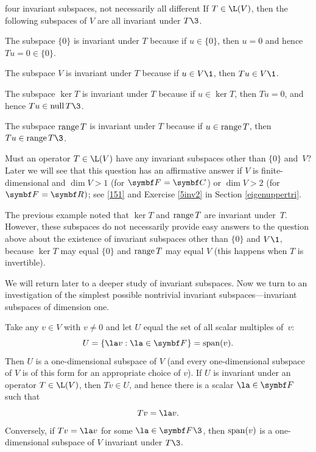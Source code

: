 \begin{example}[invariant]{four invariant subspaces, not necessarily all different}
If $T \in \L(V)$, then the following subspaces of $V$ are all invariant under $T\3$.
\begin{Subtheorem} \leftskip=-8bp
\item[\hfill$\br{0}$\hfill]
The subspace $\{0\}$ is invariant under $T$ because if $u \in \{0\}$, then $u = 0$ and hence $Tu = 0 \in \{0\}$.
\item[\hfill$V$\hfill]
The subspace $V$ is invariant under $T$ because if $u \in V\1$, then $Tu \in V\1$.
\item[\hfill$\ker T$\hfill]
The subspace $\ker T$ is invariant under $T$ because if $u \in \ker T$, then $Tu = 0$, and hence $Tu \in \ker T\3$.
\item[\hfill$\ran T$\hfill]
The subspace $\ran T$ is invariant under $T$ because if $u \in \operatorname{range} T$, then $Tu \in \ran T\3$.
\end{Subtheorem}
\vspace{-.11in}
\end{example}

\pagebreak[2]

Must an operator $T \in \L(V)$ have any invariant subspaces other than $\{0\}$ and~$V$? Later we will see that this question has an affirmative answer if $V$ is finite-dimensional and $\dim V > 1$ (for $\F{} = \C{}$) or $\dim V > 2$ (for $\F{} = \R{})$; see \ref{151} and Exercise \ref{5inv2} in Section \ref{eigenuppertri}.

The previous example noted that $\ker T$ and $\ran T$ are invariant under~$T$. However, these subspaces do not necessarily provide easy answers to the question above about the existence of invariant subspaces other than $\{0\}$ and $V\1$, because $\ker T$ may equal $\{0\}$ and $\ran T$ may equal $V$ (this happens when $T$ is invertible).

We will return later to a deeper study of invariant subspaces.
Now we turn to an investigation of the simplest possible nontrivial invariant
subspaces---invariant subspaces of dimension one.

Take any $v \in V$ with $v \ne 0$ and let $U$ equal the set of all scalar multiples of~$v$:
\[
U = \{\la v: \la \in \F{}\} = \Span (v).
\]
Then $U$ is a one-dimensional subspace of $V$ (and every one-dimensional subspace
of $V$ is of this form for an appropriate choice of $v$). If $U$ is invariant under an operator $T \in \L(V)$, then $Tv \in U$,
and hence there is a scalar $\la \in \F{}$ such that
\[
Tv = \la v.
\]
Conversely, if $Tv = \la v$ for some $\la \in \F{}\3$, then $\operatorname{span} (v)$ is a one-dimensional subspace of $V$ invariant under $T\3$.

